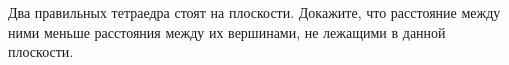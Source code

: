 Два правильных тетраедра стоят на плоскости. Докажите, что расстояние между ними меньше расстояния между их вершинами, не лежащими в данной плоскости.